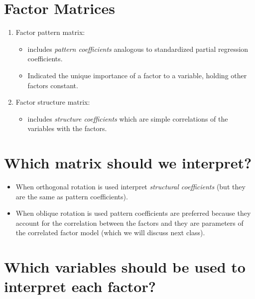 \documentclass[
]{book}
\providecommand{\tightlist}{%
  \setlength{\itemsep}{0pt}\setlength{\parskip}{0pt}}
\begin{document}
\hypertarget{factor-matrices}{%
\section{Factor Matrices}\label{factor-matrices}}

\begin{enumerate}
\def\labelenumi{\arabic{enumi}.}
\tightlist
\item
  Factor pattern matrix:

  \begin{itemize}
  \tightlist
  \item
    includes \emph{pattern coefficients} analogous to standardized partial regression coefficients.
  \item
    Indicated the unique importance of a factor to a variable, holding other factors constant.
  \end{itemize}
\item
  Factor structure matrix:

  \begin{itemize}
  \tightlist
  \item
    includes \emph{structure coefficients} which are simple correlations of the variables with the factors.
  \end{itemize}
\end{enumerate}

\hypertarget{which-matrix-should-we-interpret}{%
\section{Which matrix should we interpret?}\label{which-matrix-should-we-interpret}}

\begin{itemize}
\item
  When orthogonal rotation is used interpret \emph{structural coefficients} (but they are the same as pattern coefficients).
\item
  When oblique rotation is used pattern coefficients are preferred because they account for the correlation between the factors and they are parameters of the correlated factor model (which we will discuss next class).
\end{itemize}

\hypertarget{which-variables-should-be-used-to-interpret-each-factor}{%
\section{Which variables should be used to interpret each factor?}\label{which-variables-should-be-used-to-interpret-each-factor}}
\end{document}
